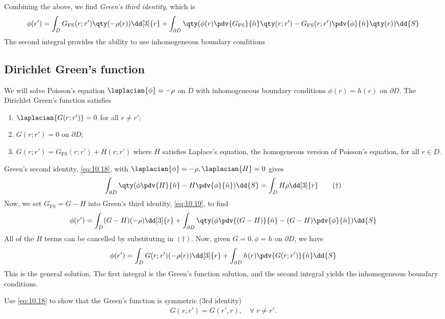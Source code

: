 Combining the above, we find \textit{Green's third identity}, which is
\begin{align} \label{eq:10.19}
	\phi(r') = \int_D G_{\mathrm{FS}}(r;r')  \qty(-\rho(r)) \dd[3]{r} + \int_{\partial D} \qty(\phi(r) \pdv{G_{\mathrm{FS}}}{\hat n} \qty(r;r') - G_{\mathrm{FS}}(r;r') \pdv{\phi}{\hat n}\qty(r)) \dd{S}
\end{align}
The second integral provides the ability to use inhomogeneous boundary conditions

\subsection{Dirichlet Green's function}
We will solve Poisson's equation $\laplacian{\phi} = -\rho$ on $D$ with inhomogeneous boundary conditions $\phi(r) = h(r)$ on $\partial D$.
The Dirichlet Green's function satisfies
\begin{enumerate}
	\item $\laplacian{G(r;r')} = 0$ for all $r \neq r'$;
	\item $G(r;r') = 0$ on $\partial D$;
	\item $G(r;r') = G_{\mathrm{FS}}(r;r') + H(r;r')$ where $H$ satisfies Laplace's equation, the homogeneous version of Poisson's equation, for all $r \in D$.
\end{enumerate}
Green's second identity, \cref{eq:10.18}, with $\laplacian{\phi} = -\rho, \laplacian{H} = 0$ gives
\begin{align*}
	\int_{\partial D} \qty(\phi \pdv{H}{\hat n} - H \pdv{\phi}{\hat n}) \dd{S} = \int_D H \rho \dd[3]{r} \tag{$\dagger$}
\end{align*}
Now, we set $G_{\mathrm{FS}} = G - H$ into Green's third identity, \cref{eq:10.19}, to find
\begin{align*}
	\phi(r') = \int_D (G - H)(-\rho) \dd[3]{r} + \int_{\partial D} \qty(\phi \pdv{(G - H)}{\hat n} - (G-H) \pdv{\phi}{\hat n}) \dd{S}
\end{align*}
All of the $H$ terms can be cancelled by substituting in $(\dagger)$.
Now, given $G = 0, \phi = h$ on $\partial D$, we have
\begin{align} \label{eq:10.20}
	\phi(r') = \int_D G(r;r')(-\rho(r)) \dd[3]{r} + \int_{\partial D} h(r) \pdv{G(r;r')}{\hat n} \dd{S}
\end{align}
This is the general solution.
The first integral is the Green's function solution, and the second integral yields the inhomogeneous boundary conditions.

\begin{exercise}
	Use \cref{eq:10.18} to show that the Green's function is symmetric (3rd identity)
	\begin{align*}
		G(r, r') = G(r', r),\quad \forall \; r \neq r'.
	\end{align*}
\end{exercise}

